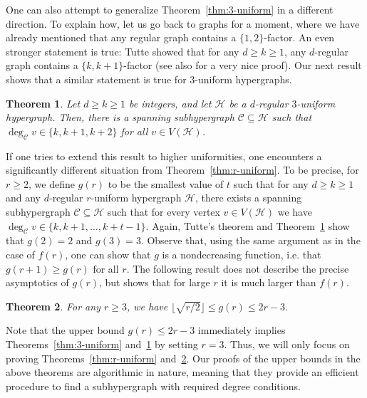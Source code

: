 \documentclass[11pt, a4paper]{article}
\newtheorem{theorem}{Theorem}
\numberwithin{theorem}{section} %
\theoremstyle{remark}
\theoremstyle{definition}
\def\cC{\mathcal{C}}
\def\cH{\mathcal{H}}
\begin{document}
\medskip

One can also attempt to generalize Theorem~\ref{thm:3-uniform} in a different direction. To explain how, let us go back to graphs for a moment, where we have already mentioned that any regular graph contains a $\{1, 2\}$-factor. An even stronger statement is true: Tutte showed that for any $d\geq k\geq 1$, any $d$-regular graph contains a $\{k, k+1\}$-factor (see also \cite{Thomassen81} for a very nice proof). Our next result shows that a similar statement is true for $3$-uniform hypergraphs.   

\begin{theorem}\label{thm:3-uniform-general}
Let $d\geq k\geq 1$ be integers, and let $\cH$ be a $d$-regular $3$-uniform hypergraph. Then, there is a spanning subhypergraph $\cC\subseteq \cH$ such that $\deg_{\cC} v\in \{k, k+1, k+2\}$ for all $v\in V(\cH)$. 
\end{theorem}

If one tries to extend this result to higher uniformities, one encounters a significantly different situation from Theorem~\ref{thm:r-uniform}. To be precise, for $r\geq 2$, we define $g(r)$ to be the smallest value of $t$ such that for any $d\geq k\geq 1$ and any $d$-regular $r$-uniform hypergraph $\cH$, there exists a spanning subhypergraph $\cC\subseteq \cH$ such that for every vertex $v\in V(\cH)$ we have $\deg_{\cC} v\in \{k, k+1, \dots, k+t-1\}$. Again, Tutte's theorem \cite{Tutte78} and Theorem~\ref{thm:3-uniform-general} show that $g(2)=2$ and $g(3)=3$. Observe that, using the same argument as in the case of $f(r)$, one can show that $g$ is a nondecreasing function, i.e. that $g(r+1)\geq g(r)$ for all $r$. The following result does not describe the precise asymptotics of $g(r)$,
but shows that for large $r$ it is much larger than $f(r)$.

\begin{theorem}\label{thm:r-uniform-general}
For any $r\geq 3$, we have $\lfloor \sqrt{r/2}\rfloor\leq g(r)\leq 2r-3$.
\end{theorem}

Note that the upper bound $g(r)\leq 2r-3$ immediately implies Theorems~\ref{thm:3-uniform} and~\ref{thm:3-uniform-general} by setting $r=3$. Thus, we will only focus on proving Theorems~\ref{thm:r-uniform} and~\ref{thm:r-uniform-general}. Our proofs of the upper bounds in the above theorems are algorithmic in nature, meaning that they provide an efficient procedure to find a subhypergraph with required degree conditions.
\end{document}
